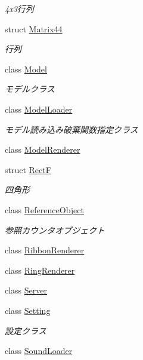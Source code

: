 \begin{DoxyCompactItemize}
\begin{DoxyCompactList}\small\item\em 4x3行列 \end{DoxyCompactList}\item 
struct \mbox{\hyperlink{struct_effekseer_1_1_matrix44}{Matrix44}}
\begin{DoxyCompactList}\small\item\em 行列 \end{DoxyCompactList}\item 
class \mbox{\hyperlink{class_effekseer_1_1_model}{Model}}
\begin{DoxyCompactList}\small\item\em モデルクラス \end{DoxyCompactList}\item 
class \mbox{\hyperlink{class_effekseer_1_1_model_loader}{Model\+Loader}}
\begin{DoxyCompactList}\small\item\em モデル読み込み破棄関数指定クラス \end{DoxyCompactList}\item 
class \mbox{\hyperlink{class_effekseer_1_1_model_renderer}{Model\+Renderer}}
\item 
struct \mbox{\hyperlink{struct_effekseer_1_1_rect_f}{RectF}}
\begin{DoxyCompactList}\small\item\em 四角形 \end{DoxyCompactList}\item 
class \mbox{\hyperlink{class_effekseer_1_1_reference_object}{Reference\+Object}}
\begin{DoxyCompactList}\small\item\em 参照カウンタオブジェクト \end{DoxyCompactList}\item 
class \mbox{\hyperlink{class_effekseer_1_1_ribbon_renderer}{Ribbon\+Renderer}}
\item 
class \mbox{\hyperlink{class_effekseer_1_1_ring_renderer}{Ring\+Renderer}}
\item 
class \mbox{\hyperlink{class_effekseer_1_1_server}{Server}}
\item 
class \mbox{\hyperlink{class_effekseer_1_1_setting}{Setting}}
\begin{DoxyCompactList}\small\item\em 設定クラス \end{DoxyCompactList}\item 
class \mbox{\hyperlink{class_effekseer_1_1_sound_loader}{Sound\+Loader}}

\end{DoxyCompactItemize}

